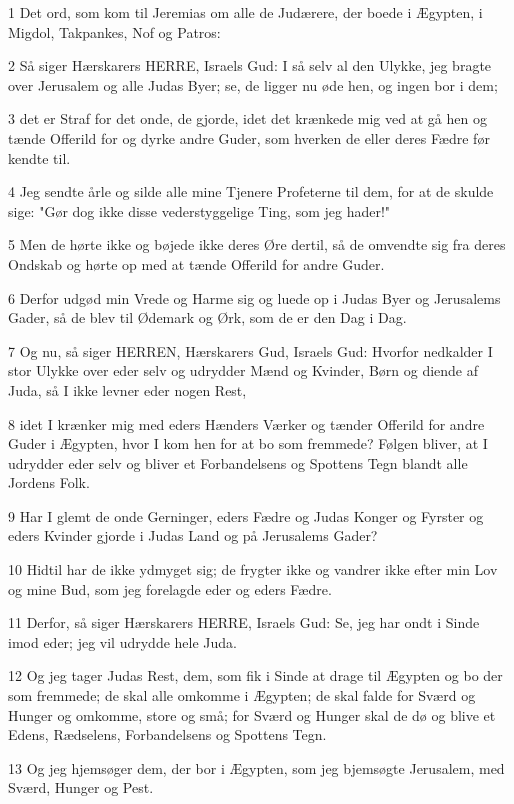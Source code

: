 \par 1 Det ord, som kom til Jeremias om alle de Judærere, der boede i Ægypten, i Migdol, Takpankes, Nof og Patros:
\par 2 Så siger Hærskarers HERRE, Israels Gud: I så selv al den Ulykke, jeg bragte over Jerusalem og alle Judas Byer; se, de ligger nu øde hen, og ingen bor i dem;
\par 3 det er Straf for det onde, de gjorde, idet det krænkede mig ved at gå hen og tænde Offerild for og dyrke andre Guder, som hverken de eller deres Fædre før kendte til.
\par 4 Jeg sendte årle og silde alle mine Tjenere Profeterne til dem, for at de skulde sige: "Gør dog ikke disse vederstyggelige Ting, som jeg hader!"
\par 5 Men de hørte ikke og bøjede ikke deres Øre dertil, så de omvendte sig fra deres Ondskab og hørte op med at tænde Offerild for andre Guder.
\par 6 Derfor udgød min Vrede og Harme sig og luede op i Judas Byer og Jerusalems Gader, så de blev til Ødemark og Ørk, som de er den Dag i Dag.
\par 7 Og nu, så siger HERREN, Hærskarers Gud, Israels Gud: Hvorfor nedkalder I stor Ulykke over eder selv og udrydder Mænd og Kvinder, Børn og diende af Juda, så I ikke levner eder nogen Rest,
\par 8 idet I krænker mig med eders Hænders Værker og tænder Offerild for andre Guder i Ægypten, hvor I kom hen for at bo som fremmede? Følgen bliver, at I udrydder eder selv og bliver et Forbandelsens og Spottens Tegn blandt alle Jordens Folk.
\par 9 Har I glemt de onde Gerninger, eders Fædre og Judas Konger og Fyrster og eders Kvinder gjorde i Judas Land og på Jerusalems Gader?
\par 10 Hidtil har de ikke ydmyget sig; de frygter ikke og vandrer ikke efter min Lov og mine Bud, som jeg forelagde eder og eders Fædre.
\par 11 Derfor, så siger Hærskarers HERRE, Israels Gud: Se, jeg har ondt i Sinde imod eder; jeg vil udrydde hele Juda.
\par 12 Og jeg tager Judas Rest, dem, som fik i Sinde at drage til Ægypten og bo der som fremmede; de skal alle omkomme i Ægypten; de skal falde for Sværd og Hunger og omkomme, store og små; for Sværd og Hunger skal de dø og blive et Edens, Rædselens, Forbandelsens og Spottens Tegn.
\par 13 Og jeg hjemsøger dem, der bor i Ægypten, som jeg bjemsøgte Jerusalem, med Sværd, Hunger og Pest.
